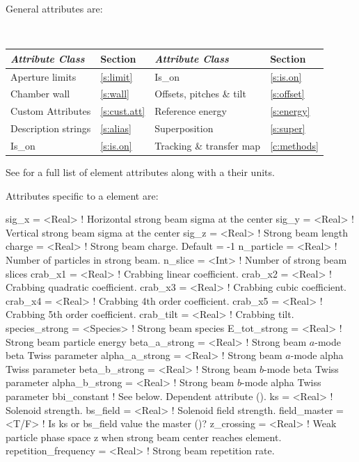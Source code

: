General  attributes are:
\begin{center} 
\tt
\begin{tabular}{llll} \toprule
  {\sl Attribute Class}      & Section          & {\sl Attribute Class}      & Section         \\ \midrule
  Aperture limits            & \ref{s:limit}    & Is_on                      & \ref{s:is.on}   \\
  Chamber wall               & \ref{s:wall}     & Offsets, pitches \& tilt   & \ref{s:offset}  \\
  Custom Attributes          & \ref{s:cust.att} & Reference energy           & \ref{s:energy}  \\
  Description strings        & \ref{s:alias}    & Superposition              & \ref{s:super}   \\
  Is_on                      & \ref{s:is.on}    & Tracking \& transfer map   & \ref{c:methods} \\ 
  \bottomrule
\end{tabular}
\end{center}
\toffset
See  for a full list of element attributes along with a their units.

Attributes specific to a  element are:
\begin{example}
  sig_x          = <Real>    ! Horizontal strong beam sigma at the center 
  sig_y          = <Real>    ! Vertical strong beam sigma at the center
  sig_z          = <Real>    ! Strong beam length
  charge         = <Real>    ! Strong beam charge. Default = -1
  n_particle     = <Real>    ! Number of particles in strong beam.
  n_slice        = <Int>     ! Number of strong beam slices
  crab_x1        = <Real>    ! Crabbing linear coefficient.
  crab_x2        = <Real>    ! Crabbing quadratic coefficient.
  crab_x3        = <Real>    ! Crabbing cubic coefficient.
  crab_x4        = <Real>    ! Crabbing 4th order coefficient.
  crab_x5        = <Real>    ! Crabbing 5th order coefficient.
  crab_tilt      = <Real>    ! Crabbing tilt.
  species_strong = <Species> ! Strong beam species
  E_tot_strong   = <Real>    ! Strong beam particle energy
  beta_a_strong  = <Real>    ! Strong beam $a$-mode beta Twiss parameter
  alpha_a_strong = <Real>    ! Strong beam $a$-mode alpha Twiss parameter 
  beta_b_strong  = <Real>    ! Strong beam $b$-mode beta Twiss parameter
  alpha_b_strong = <Real>    ! Strong beam $b$-mode alpha Twiss parameter
  bbi_constant               ! See below. Dependent attribute ().
  ks             = <Real>    ! Solenoid strength.
  bs_field       = <Real>    ! Solenoid field strength.
  field_master   = <T/F>     ! Is ks or bs_field value the master ()?
  z_crossing     = <Real>    ! Weak particle phase space z when strong beam center reaches element.
  repetition_frequency = <Real>  ! Strong beam repetition rate.
\end{example}

